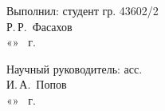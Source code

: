 





\hfill\begin{minipage}{0.4\textwidth}
  Выполнил: студент гр. 43602/2\\
  \underline{\hspace{\ML}} Р.\,Р.~Фасахов\\
  «\underline{\hspace{0.7cm}}» \underline{\hspace{\ML}} \thesisYear\ г.
\end{minipage}%

\bigskip

\hfill\begin{minipage}{0.4\textwidth}
  Научный руководитель: асс.\\
  \underline{\hspace{\ML}} И.\,А.~Попов\\
  «\underline{\hspace{0.7cm}}» \underline{\hspace{\ML}} \thesisYear\ г.
\end{minipage}%

\vfill

%
\vspace{0pt plus4fill} %
\begin{center}%
{\thesisCity \\ \thesisYear}
\end{center}%
\newpage
